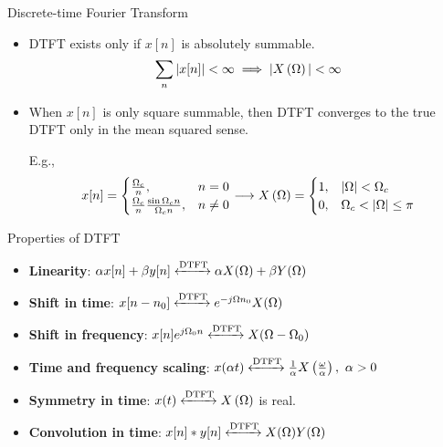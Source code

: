 \documentclass[aspectratio=169]{beamer}
\let\olditem\item
\renewcommand{\item}{\setlength{\itemsep}{\fill}\olditem}
\def\lp{\ensuremath\left(}
\def\rp{\ensuremath\right)}
\begin{document}
\begin{frame}[t]{Discrete-time Fourier Transform}
\begin{itemize}
  \item DTFT exists only if $x[n]$ is absolutely summable.
  \[ \sum_n \vert x[n] \vert < \infty  \implies \vert X\lp \Omega \rp \vert < \infty \]

  \item When $x[n]$ is only square summable, then DTFT converges to the true DTFT only in the mean squared sense.

  E.g., 
  \[ x[n] = \begin{cases} \frac{\Omega_c}{n}, & n = 0 \\ \frac{\Omega_c}{n} \frac{\sin \Omega_c n}{\Omega_c n}, & n \neq 0 \end{cases} \longrightarrow X\lp \Omega \rp  = \begin{cases} 1, & \vert \Omega \vert < \Omega_c  \\  0, & \Omega_c < \vert \Omega \vert \leq \pi \end{cases} \]
\end{itemize}  
\end{frame}


\begin{frame}[t]{Properties of DTFT}
\begin{itemize}
  \item \textbf{Linearity}: $\alpha x[n] + \beta y[n] \xleftrightarrow{\text{DTFT}} \alpha X(\Omega) + \beta Y(\Omega)$
  \item \textbf{Shift in time}: $ x[n-n_0] \xleftrightarrow{\text{DTFT}} e^{-j\Omega n_0}X(\Omega)$
  \item \textbf{Shift in frequency}: $ x[n]e^{j\Omega_0 n} \xleftrightarrow{\text{DTFT}} X(\Omega - \Omega_0) $
  \item \textbf{Time and frequency scaling}: $ x(\alpha t) \xleftrightarrow{\text{DTFT}} \frac{1}{\alpha} X\left(\frac{\omega}{\alpha}\right), \,\, \alpha > 0 $
  \item \textbf{Symmetry in time}: $ x(t) \xleftrightarrow{\text{DTFT}} X\left(\Omega\right)$ is real.
  \item \textbf{Convolution in time}: $x[n] * y[n] \xleftrightarrow{\text{DTFT}} X(\Omega)Y(\Omega)$
\end{itemize}
\end{frame}
\end{document}
